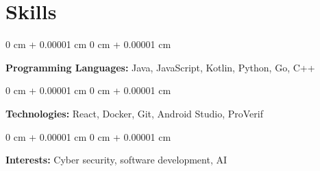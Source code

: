 \documentclass[10pt, a4paper]{article}
\newenvironment{onecolentry}{
    \begin{adjustwidth}{
        0 cm + 0.00001 cm
    }{
        0 cm + 0.00001 cm
    }
}{
    \end{adjustwidth}
} %
\begin{document}
    
    \section{Skills}



        
        \begin{onecolentry}
            \textbf{Programming Languages:} Java, JavaScript, Kotlin, Python, Go, C++
        \end{onecolentry}

        \vspace{0.2 cm}

        \begin{onecolentry}
            \textbf{Technologies:} React, Docker, Git, Android Studio, ProVerif
        \end{onecolentry}

        \vspace{0.2 cm}

        \begin{onecolentry}
            \textbf{Interests:} Cyber security, software development, AI
        \end{onecolentry}


    
\end{document}
